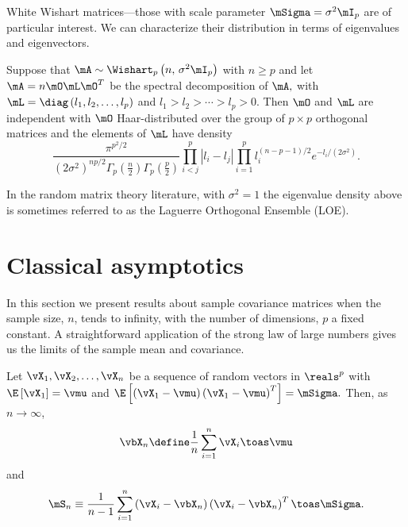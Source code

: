 White Wishart matrices---those with scale parameter $\mSigma = \sigma^2 \mI_p$
are of particular interest.  We can characterize their distribution in
terms of eigenvalues and eigenvectors.

\begin{proposition}
Suppose that
\(
    \mA
    \sim
    \Wishart_p \left(
        n, \,
        \sigma^2 \mI_p
    \right)
\)
with
\(
    n \geq p
\)
and let
\(
    \mA = n \mO \mL \mO^T
\)
be the spectral decomposition of
\(
    \mA,
\)
with
\(
    \mL
    =
    \diag \left(
        l_1,
        l_2,
        \ldots,
        l_p
    \right)
\)
and
\(
    l_1
    >
    l_2
    >
    \cdots
    >
    l_p
    >
    0.
\)
Then $\mO$ and $\mL$ are independent with $\mO$ Haar-distributed over
the group of $p \times p$ orthogonal matrices and the elements of $\mL$
have density
\begin{equation}\label{E:wishart-eig-density}
    \frac{ \pi^{p^2/2} }
         { \left( 2 \sigma^2 \right)^{np/2}
           \Gamma_p \left( \frac{n}{2} \right) 
           \Gamma_p \left( \frac{p}{2} \right) }
    \prod_{i < j}^p
        \left| l_i - l_j \right|
    \prod_{i=1}^p
        l_i^{(n-p-1)/2}
        e^{-l_i/(2 \sigma^2)}.
\end{equation}    
\end{proposition}
\noindent
In the random matrix theory literature, with $\sigma^2 = 1$ the eigenvalue density above is sometimes referred to as the Laguerre Orthogonal Ensemble (LOE).

\section{Classical asymptotics}\label{S:multivariate-classical}

In this section we present results about sample covariance matrices when the sample size, $n$, tends to infinity, with the number of dimensions, $p$ a fixed constant.  A straightforward application of the strong law of large numbers gives us the limits of the sample mean and covariance.

\begin{lemma}\label{L:suff-stat-limits}
Let $\vX_1, \vX_2, \ldots, \vX_n$ be a sequence of \iid random vectors in $\reals^p$ with
\(
    \E \left[
        \vX_1
    \right]
    =
    \vmu
\)
and
\(
    \E \left[
        \left( \vX_1 - \vmu \right)
        \left( \vX_1 - \vmu \right)^T
    \right]
    =
    \mSigma.
\)
Then, as $n \to \infty$,
\[
    \vbX_n
    \define
    \frac{1}{n}
    \sum_{i=1}^n
        \vX_i
    \toas
    \vmu
\]
and
\[
    \mS_n
    \equiv
    \frac{1}{n-1}
    \sum_{i=1}^{n}
        \left( \vX_i - \vbX_n \right)
        \left( \vX_i - \vbX_n \right)^T
    \toas
    \mSigma.
\]
\end{lemma}


